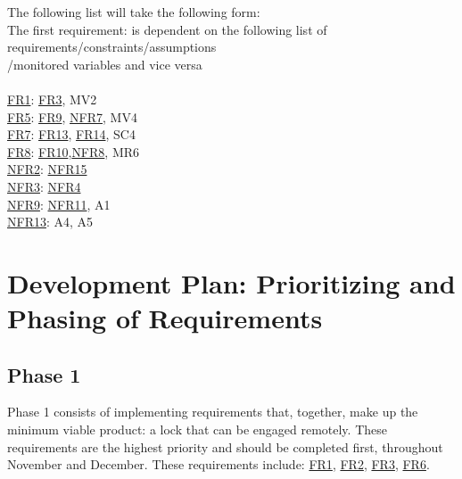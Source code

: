 \documentclass[12pt]{article}
\begin{document}
The following list will take the following form:
\\The first requirement: is dependent on the following list of requirements/constraints/assumptions
\\
/monitored variables and vice versa
\\
 \\  \hyperref[FRDisengage]{FR1}: \hyperref[FRLockStatusDisengaged]{FR3}, MV2
\\  \hyperref[FRSturdy]{FR5}: \hyperref[FRLocDisplay]{FR9}, \hyperref[NFRAccuracyPos]{NFR7}, MV4
\\  \hyperref[FRBikeFrame]{FR7}: \hyperref[NFRTools]{FR13}, \hyperref[NFRModels]{FR14}, SC4
\\  \hyperref[FRBatteryLevelDisplay]{FR8}: \hyperref[FRPower]{FR10},\hyperref[NFRBatteryLevel]{NFR8}, MR6
\\  \hyperref[NFRStor]{NFR2}: \hyperref[NFRGUI]{NFR15}
\\  \hyperref[NFRVisual]{NFR3}: \hyperref[NFRFunc]{NFR4}
 \\  \hyperref[NFRCompQuick]{NFR9}: \hyperref[NFRBatteryLife]{NFR11}, A1
 \\  \hyperref[NFRTools]{NFR13}: A4, A5
\section{Development Plan: Prioritizing and Phasing of Requirements}


\subsection{Phase 1}
Phase 1 consists of implementing requirements that, together, make up the minimum viable product: a lock that can be engaged remotely. These requirements are the highest priority and should be completed first, throughout November and December. These requirements include:
\hyperref[FRDisengage]{FR1}, \hyperref[FRLockStatusEngaged]{FR2}, \hyperref[FRLockStatusDisengaged]{FR3}, \hyperref[FRCorrectUser]{FR6}.
\end{document}
